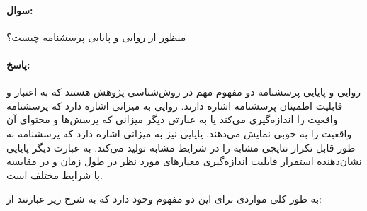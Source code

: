 \documentclass[a4paper,10pt]{article}
\begin{document}
    \paragraph{سوال:} منظور از روایی و پایایی  پرسشنامه چیست؟

    \paragraph{پاسخ:} روایی و پایایی پرسشنامه دو مفهوم مهم در روش‌شناسی پژوهش هستند که به اعتبار و قابلیت اطمینان پرسشنامه اشاره دارند. روایی به میزانی اشاره دارد که پرسشنامه واقعیت را اندازه‌گیری می‌کند یا به عبارتی دیگر میزانی که پرسش‌ها و محتوای آن واقعیت را به خوبی نمایش می‌دهند. پایایی نیز به میزانی اشاره دارد که پرسشنامه به طور قابل تکرار نتایجی مشابه را در شرایط مشابه تولید می‌کند. به عبارت دیگر پایایی نشان‌دهنده استمرار قابلیت اندازه‌گیری معیارهای مورد نظر در طول زمان و در مقابسه با شرایط مختلف است.

    به طور کلی مواردی برای این دو مفهوم وجود دارد که به شرح زیر عبارتند از:
\end{document}
